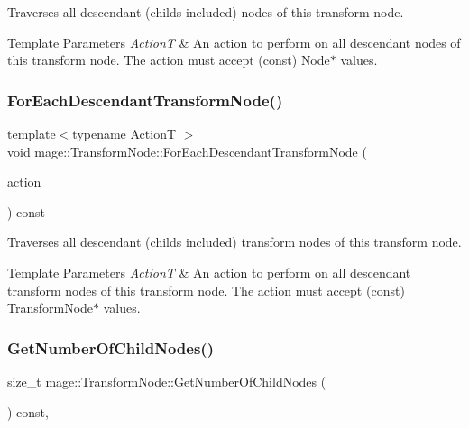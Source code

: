 Traverses all descendant (childs included) nodes of this transform node.


\begin{DoxyTemplParams}{Template Parameters}
{\em ActionT} & An action to perform on all descendant nodes of this transform node. The action must accept ({\ttfamily const}) {\ttfamily Node$\ast$} values. \\
\hline
\end{DoxyTemplParams}
\hypertarget{structmage_1_1_transform_node_a7a052715d9591defa06e494017539711}{}\label{structmage_1_1_transform_node_a7a052715d9591defa06e494017539711} 
\subsubsection{\texorpdfstring{For\+Each\+Descendant\+Transform\+Node()}{ForEachDescendantTransformNode()}}
{\footnotesize\ttfamily template$<$typename ActionT $>$ \\
void mage\+::\+Transform\+Node\+::\+For\+Each\+Descendant\+Transform\+Node (\begin{DoxyParamCaption}\item[{ActionT}]{action }\end{DoxyParamCaption}) const\hspace{0.3cm}{\ttfamily [private]}}

Traverses all descendant (childs included) transform nodes of this transform node.


\begin{DoxyTemplParams}{Template Parameters}
{\em ActionT} & An action to perform on all descendant transform nodes of this transform node. The action must accept ({\ttfamily const}) {\ttfamily Transform\+Node$\ast$} values. \\
\hline
\end{DoxyTemplParams}
\hypertarget{structmage_1_1_transform_node_a3efc0401cee8fc6215148963ce3e8227}{}\label{structmage_1_1_transform_node_a3efc0401cee8fc6215148963ce3e8227} 
\subsubsection{\texorpdfstring{Get\+Number\+Of\+Child\+Nodes()}{GetNumberOfChildNodes()}}
{\footnotesize\ttfamily size\+\_\+t mage\+::\+Transform\+Node\+::\+Get\+Number\+Of\+Child\+Nodes (\begin{DoxyParamCaption}{ }\end{DoxyParamCaption}) const\hspace{0.3cm}{\ttfamily [private]}, {\ttfamily [noexcept]}}

